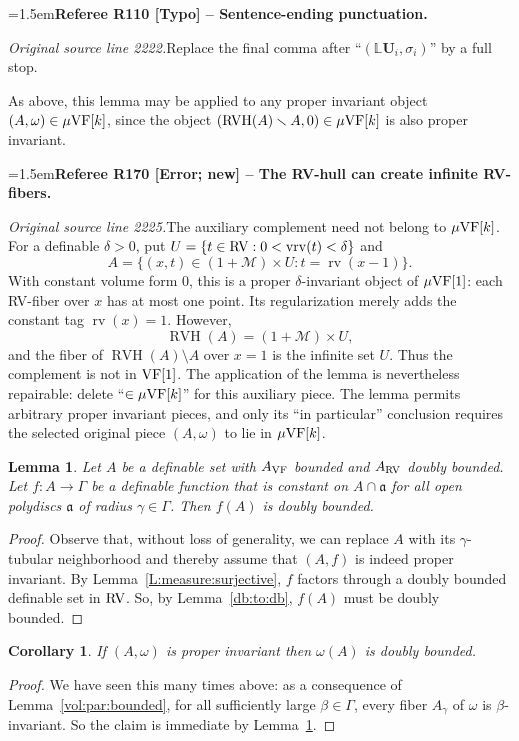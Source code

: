 \documentclass[12pt]{amsart}
\newcommand{\RefereeRemark}[4]{%
  \par\medskip\begingroup\normalfont\small\color{RefereePurple}%
  \emergencystretch=1.5em\noindent\textbf{Referee R#1 [#2] -- #3.}\par\nobreak\noindent #4\par
  \endgroup\medskip
}
\theoremstyle{plain}
\newtheorem{cor}[thm]{Corollary}
\newtheorem{lem}[thm]{Lemma}
\theoremstyle{definition}
\theoremstyle{remark}
\numberwithin{equation}{section}
\theoremstyle{plain}
\newcommand{\VF}{\textup{VF}}
\newcommand{\RV}{\textup{RV}}
\newcommand{\MM}{\mdl M}
\newcommand{\ga}{\mathfrak{a}}
\newcommand{\0}{\emptyset}
\newcommand{\mdl}[1]{\mathcal{#1}}  %
\newcommand{\fun}{\longrightarrow}
\newcommand{\mi}{\smallsetminus}
\newcommand{\mVF}{{\mu}{\VF}}
\DeclareMathOperator{\rv}{rv}
\DeclareMathOperator{\vrv}{vrv}
\DeclareMathOperator{\RVH}{RVH}
\begin{document}
\RefereeRemark{110}{Typo}{Sentence-ending punctuation}{%
\textit{Original source line 2222.}\quad Replace the final comma after ``$(\mathbb L\bm U_i,\sigma_i)$'' by a full stop.
}

As above, this lemma may be applied to any proper invariant object $(A, \omega) \in \mVF[k]$, since  the object $(\RVH(A) \mi A, 0) \in \mVF[k]$  is also proper invariant.


\RefereeRemark{170}{Error; new}{The RV-hull can create infinite RV-fibers}{%
\textit{Original source line 2225.}\quad The auxiliary complement need not belong to $\mVF[k]$. For a definable $\delta>0$, put $U=\{t\in\RV:0<\vrv(t)<\delta\}$ and
\[
 A=\{(x,t)\in(1+\MM)\times U:t=\rv(x-1)\}.
\]
With constant volume form $0$, this is a proper $\delta$-invariant object of $\mVF[1]$: each RV-fiber over $x$ has at most one point. Its regularization merely adds the constant tag $\rv(x)=1$. However,
\[
 \RVH(A)=(1+\MM)\times U,
\]
and the fiber of $\RVH(A)\setminus A$ over $x=1$ is the infinite set $U$. Thus the complement is not in $\VF[1]$. The application of the lemma is nevertheless repairable: delete ``$\in\mVF[k]$'' for this auxiliary piece. The lemma permits arbitrary proper invariant pieces, and only its ``in particular'' conclusion requires the selected original piece $(A,\omega)$ to lie in $\mVF[k]$.
}


\begin{lem}\label{invar:db}
Let $A$ be a definable set with $A_{\VF}$  bounded and $A_{\RV}$  doubly bounded. Let $f : A \fun \Gamma$ be a definable function  that is constant on $A \cap \ga$ for all open polydiscs $\ga$ of radius $\gamma \in \Gamma$. Then $f(A)$ is doubly bounded.
\end{lem}
\begin{proof}
Observe that, without loss of generality, we can replace $A$ with its $\gamma$-tubular neighborhood and thereby  assume that $(A,f)$ is indeed proper invariant. By Lemma~\ref{L:measure:surjective}, $f$ factors through a doubly bounded definable set in $\RV$. So, by Lemma~\ref{db:to:db},  $f(A)$ must be doubly bounded.
\end{proof}

\begin{cor}
If $(A, \omega)$ is proper invariant then $\omega(A)$ is doubly bounded.
\end{cor}
\begin{proof}
We have seen this many times above: as a consequence of Lemma~\ref{vol:par:bounded}, for all sufficiently large $\beta \in \Gamma$, every fiber $A_\gamma$ of $\omega$ is $\beta$-invariant. So the claim is immediate by Lemma~\ref{invar:db}.
\end{proof}
\end{document}
